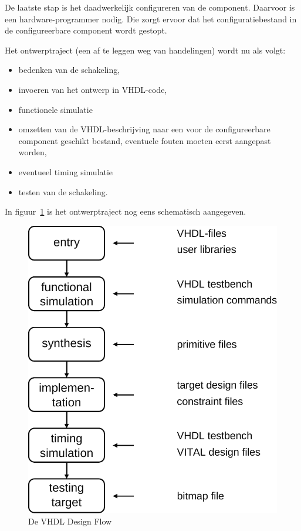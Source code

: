 \documentclass[a4paper,12pt,fleqn,twoside]{book}
\begin{document}
De laatste stap is het daadwerkelijk configureren van de component. Daarvoor is
een hardware-programmer nodig. Die zorgt ervoor dat het configuratiebestand in
de configureerbare component wordt gestopt.

\newpage
Het ontwerptraject (een af te leggen weg van handelingen) wordt nu als volgt:

\begin{itemize}\itemsep-1pt
\item bedenken van de schakeling,
\item invoeren van het ontwerp in VHDL-code,
\item functionele simulatie
\item omzetten van de VHDL-beschrijving naar een voor de configureerbare
      component geschikt bestand, eventuele fouten moeten eerst aangepast
      worden,
\item eventueel timing simulatie
\item testen van de schakeling.
\end{itemize}

In figuur~\ref{fig:009designflow} is het ontwerptraject nog eens schematisch
aangegeven.
 
\begin{figure}[H]
\centering
\includegraphics[scale=0.63]{009designflow.pdf}
\caption{De VHDL Design Flow}
\label{fig:009designflow}
\end{figure}
\end{document}
